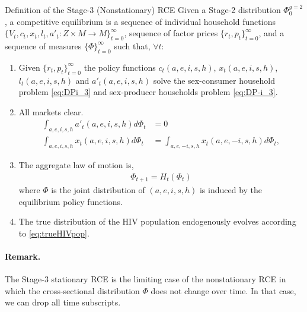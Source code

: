 \begin{myexampleblock}{Definition of the Stage-3 (Nonstationary) RCE}
Given a Stage-2 distribution $\Phi^{g=2}_{0}$, a competitive equilibrium is a sequence of individual household functions $\{V_t,c_t,x_t,l_t,a'_{t}: Z \times M \rightarrow M\}_{t=0}^\infty$, sequence of factor prices $\{r_t,p_t\}_{t=0}^\infty$, and a sequence of measures $\{\Phi\}_{t=0}^\infty$ such that, $\forall t$:
\begin{enumerate}
    \item Given $\{r_t,p_t\}_{t=0}^\infty$ the policy functions $c_t(a,e,i,s,h)$, $x_t(a,e,i,s,h)$, $l_t(a,e,i,s,h)$ and $a'_t(a,e,i,s,h)$ solve the sex-consumer household problem \eqref{eq:DPi_3} and sex-producer households problem \eqref{eq:DP-i_3}.
\item All markets clear.
 \begin{align*}
\int_{a,e,i,s,h} a'_t(a,e,i,s,h) d\Phi_t &= 0 \\
\int_{a,e,i,s,h} x_t(a,e,i,s,h) d \Phi_t &= \int_{a,e,-i,s,h} x_t(a,e,-i,s,h) d\Phi_t,
\end{align*}
\item The aggregate law of motion is,
 \begin{align*}
     \Phi_{t+1} = H_t(\Phi_t)
 \end{align*}
 where $\Phi$ is the joint distribution of $(a,e,i,s,h)$ is induced by the equilibrium policy functions.
 \item The true distribution of the HIV population endogenously evolves according to \eqref{eq:trueHIVpop}.
 \end{enumerate}
 
\paragraph{Remark.} The Stage-3 stationary RCE is the limiting case of the nonstationary RCE in which the cross-sectional distribution $\Phi$ does not change over time. In that case, we can drop all time subscripts.
 
\end{myexampleblock}


\newpage

\bigskip
